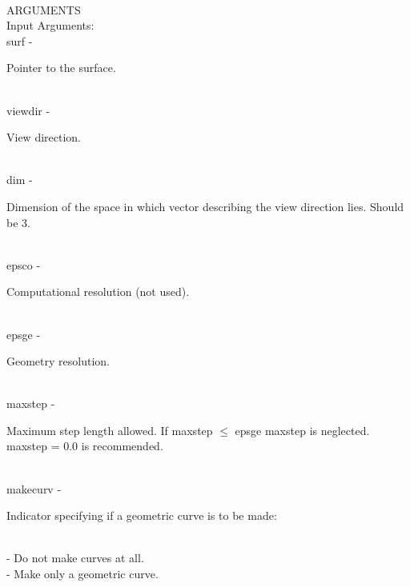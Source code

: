 \\
ARGUMENTS\\
        \>Input Arguments:\\
        \>\>    {\fov surf}\> - \>              \begin{minipg2}
                                Pointer to the surface.
                                \end{minipg2}\\
        \>\>    {\fov viewdir}\> - \>   \begin{minipg2}
                                View direction.
                                \end{minipg2}\\
        \>\>    {\fov dim}\> - \>       \begin{minipg2}
                                Dimension of the space in which vector describing the view
                                direction lies. Should be 3.
                                \end{minipg2}\\[0.8ex]
        \>\>    {\fov epsco}\> - \>     \begin{minipg2}
                                Computational resolution (not used).
                                \end{minipg2}\\
        \>\>    {\fov epsge}\> - \>     \begin{minipg2}
                                Geometry resolution.
                                \end{minipg2}\\
        \>\>    {\fov maxstep}\> - \>   \begin{minipg2}
                                Maximum step length allowed.
                                If maxstep $\leq$ epsge maxstep is
                                neglected. maxstep = 0.0 is recommended.
                                \end{minipg2}\\
\newpagetabs
        \>\>    {\fov makecurv}\> - \>  \begin{minipg2}
                                Indicator specifying if a geometric curve is to be made:
                                \end{minipg2}\\
                \>\>\>\> -     \>Do not make curves at all.\\
                \>\>\>\> -     \>Make only a geometric curve.\\
